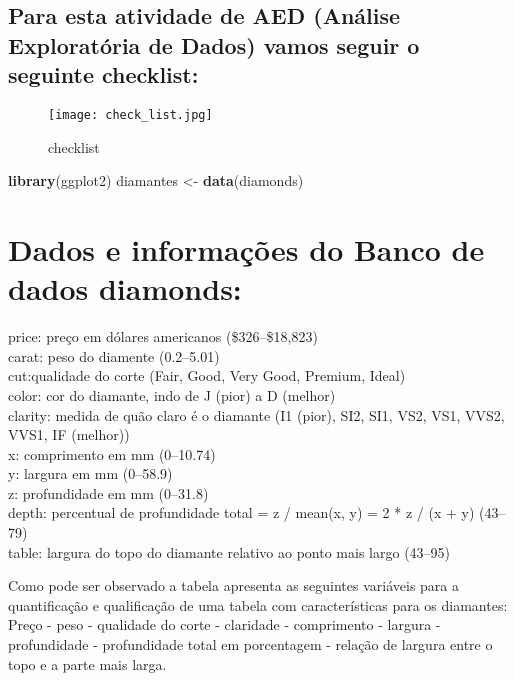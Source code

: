 \documentclass[
]{article}
\newenvironment{Shaded}{\begin{snugshade}}{\end{snugshade}}
\newcommand{\KeywordTok}[1]{\textcolor[rgb]{0.13,0.29,0.53}{\textbf{#1}}}
\newcommand{\NormalTok}[1]{#1}
\newcommand{\StringTok}[1]{\textcolor[rgb]{0.31,0.60,0.02}{#1}}
\begin{document}
\hypertarget{para-esta-atividade-de-aed-anuxe1lise-exploratuxf3ria-de-dados-vamos-seguir-o-seguinte-checklist}{%
\subsection{Para esta atividade de AED (Análise Exploratória de Dados)
vamos seguir o seguinte
checklist:}\label{para-esta-atividade-de-aed-anuxe1lise-exploratuxf3ria-de-dados-vamos-seguir-o-seguinte-checklist}}

\begin{figure}
\centering
\texttt{[image: check\_list.jpg]}
\caption{checklist}
\end{figure}

\begin{Shaded}
\begin{Highlighting}[]
\KeywordTok{library}\NormalTok{(ggplot2)}
\NormalTok{diamantes <-}\StringTok{ }\KeywordTok{data}\NormalTok{(diamonds)}
\end{Highlighting}
\end{Shaded}

\hypertarget{dados-e-informauxe7uxf5es-do-banco-de-dados-diamonds}{%
\section{Dados e informações do Banco de dados
diamonds:}\label{dados-e-informauxe7uxf5es-do-banco-de-dados-diamonds}}

price: preço em dólares americanos (\$326--\$18,823)\\
carat: peso do diamente (0.2--5.01)\\
cut:qualidade do corte (Fair, Good, Very Good, Premium, Ideal)\\
color: cor do diamante, indo de J (pior) a D (melhor)\\
clarity: medida de quão claro é o diamante (I1 (pior), SI2, SI1, VS2,
VS1, VVS2, VVS1, IF (melhor))\\
x: comprimento em mm (0--10.74)\\
y: largura em mm (0--58.9)\\
z: profundidade em mm (0--31.8)\\
depth: percentual de profundidade total = z / mean(x, y) = 2 * z / (x +
y) (43--79)\\
table: largura do topo do diamante relativo ao ponto mais largo (43--95)

Como pode ser observado a tabela apresenta as seguintes variáveis para a
quantificação e qualificação de uma tabela com características para os
diamantes:\\
Preço - peso - qualidade do corte - claridade - comprimento - largura -
profundidade - profundidade total em porcentagem - relação de largura
entre o topo e a parte mais larga.
\end{document}
